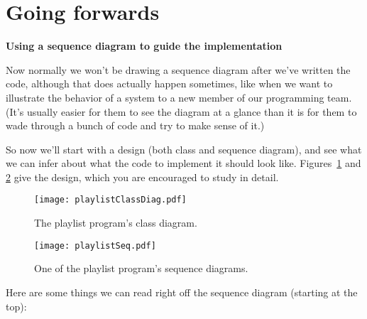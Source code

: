 \section{Going forwards}

\vspace{-.2in}
{\large \textbf{Using a sequence diagram to guide the implementation}}

Now normally we won't be drawing a sequence diagram after we've written the
code, although that does actually happen sometimes, like when we want to
illustrate the behavior of a system to a new member of our programming team.
(It's usually easier for them to see the diagram at a glance than it is for
them to wade through a bunch of code and try to make sense of it.)

So now we'll start with a design (both class and sequence diagram), and see
what we can infer about what the code to implement it should look like.
Figures~\ref{fig:playlistClassDiag} and \ref{fig:playlistSeq} give the
design, which you are encouraged to study in detail.

\begin{figure}
\centering
\texttt{[image: playlistClassDiag.pdf]}
\caption{The playlist program's class diagram.}
\label{fig:playlistClassDiag}

\end{figure}
\begin{figure}
\centering
\hspace*{-1.2in}
\texttt{[image: playlistSeq.pdf]}
\vspace{.1in}
\caption{One of the playlist program's sequence diagrams.}
\quad\quad\quad\quad\quad %
\label{fig:playlistSeq}
\end{figure}

Here are some things we can read right off the sequence diagram (starting at
the top):


